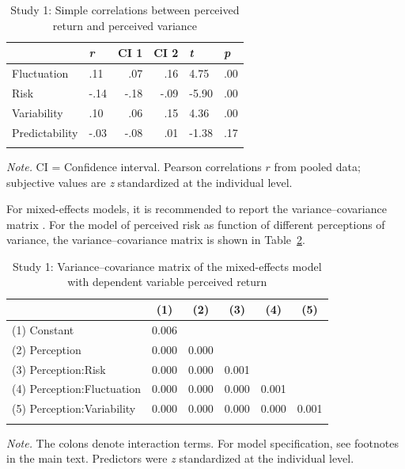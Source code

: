 \begin{table}[H]
\begin{center}
\begin{threeparttable}
\caption{Study 1: Simple correlations between perceived return and perceived variance
  \label{sup:tab:study1_rrc}}
\begin{tabular}{llrrll}
\toprule
 & \textit{r} & CI 1 & CI 2 & \textit{t} & \textit{p}\\
\midrule
Fluctuation & .11 & .07 & .16 & 4.75 & .00\\
Risk & -.14 & -.18 & -.09 & -5.90 & .00\\
Variability & .10 & .06 & .15 & 4.36 & .00\\
Predictability & -.03 & -.08 & .01 & -1.38 & .17\\
\bottomrule
\addlinespace
\end{tabular}
\begin{tablenotes}[para]
\normalsize{\textit{Note.} CI = Confidence interval. Pearson correlations $r$ from pooled data; subjective values are \textit{z} standardized at the individual level.}
\end{tablenotes}
\end{threeparttable}
\end{center}
\end{table}


For mixed-effects models, it is recommended to report the variance--covariance matrix \cite{Barr2013}. For the model of perceived risk as function of different perceptions of variance, the variance--covariance matrix is shown in Table~\ref{sup:tab:study_1_vcovmat}. 

\begin{table}[H]
\begin{center}
\begin{threeparttable}
\caption{Study 1: Variance--covariance matrix of the mixed-effects model with dependent variable perceived return}
\label{sup:tab:study_1_vcovmat}
\begin{tabular}{llllll}
\toprule
 & \multicolumn{1}{c}{(1)} & \multicolumn{1}{c}{(2)} & \multicolumn{1}{c}{(3)} & \multicolumn{1}{c}{(4)} & \multicolumn{1}{c}{(5)}\\
\midrule
(1) Constant & 0.006 &  &  &  & \\
(2) Perception & 0.000 & 0.000 &  &  & \\
(3) Perception:Risk & 0.000 & 0.000 & 0.001 &  & \\
(4) Perception:Fluctuation & 0.000 & 0.000 & 0.000 & 0.001 & \\
(5) Perception:Variability & 0.000 & 0.000 & 0.000 & 0.000 & 0.001\\
\bottomrule
\addlinespace
\end{tabular}
\begin{tablenotes}[para]
\normalsize{\textit{Note.}  The colons denote interaction terms. For model specification, see footnotes in the main text. Predictors were \textit{z} standardized at the individual level.}
\end{tablenotes}
\end{threeparttable}
\end{center}
\end{table}

